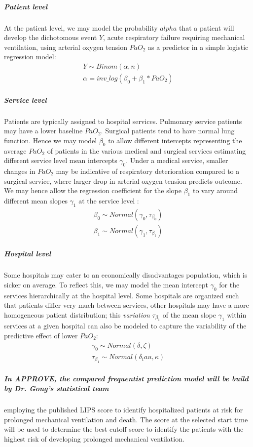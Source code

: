 \documentclass[11pt,notitlepage]{article}
\begin{document}
\subparagraph*{Patient level}
At the patient level, we may model the probability $alpha$ that a patient will develop the dichotomous event $Y$, acute respiratory failure requiring mechanical ventilation, using arterial oxygen tension $PaO_{2}$ as a predictor in a simple logistic regression model: 
\begin{align}
Y \sim Binom (\alpha, n) \\
\alpha = inv\_log (\beta_{0} +\beta_{1} * PaO_2)
\end{align}

\subparagraph*{Service  level}
Patients are typically assigned to hospital services. Pulmonary service patients may have a lower baseline $PaO_2$. Surgical patients tend to have normal lung function. Hence we may model $\beta_{0}$ to allow different intercepts representing the average $PaO_2$ of patients in the various medical and surgical services estimating different service level mean intercepts $\gamma_0$. Under a medical service, smaller changes in $PaO_2$ may be indicative of respiratory deterioration compared to a surgical service, where larger drop in arterial oxygen tension predicts outcome. We may hence allow the regression coefficient for the slope $\beta_{1}$ to vary around different mean slopes $\gamma_1$ at the service level : 
\begin{align}
 \beta_{0} \sim Normal (\gamma_0 , \tau_{\beta_0}) \\
 \beta_{1} \sim Normal (\gamma_1, \tau_{\beta_1})
\end{align}

\subparagraph*{Hospital level}
Some hospitals may cater to an economically disadvantages population, which is sicker on average. To reflect this, we may  model the mean intercept $\gamma_0$ for the services hierarchically at the hospital level. Some hospitals are organized such that patients differ very much between services, other hospitals may have a more homogeneous patient distribution; this \textit{variation} $\tau_{\beta_1}$ of the mean slope $\gamma_1$ within services at a given hospital can also be modeled to capture the variability of the predictive effect of lower $PaO_2$:
\begin{align}
\gamma_0 \sim Normal (\delta, \zeta) \\
\tau_{\beta_1} \sim Normal(\delta_tau, \kappa) 
\end{align}

\subparagraph*{In APPROVE, the compared frequentist prediction model will be build by Dr. Gong's statistical team} employing the published LIPS score \cite{Herridge_12594312} to identify hospitalized patients at risk for prolonged mechanical ventilation and death. The score at the selected start time will be used to determine the best cutoff score to identify the patients with the highest risk of developing prolonged mechanical ventilation.
\end{document}
